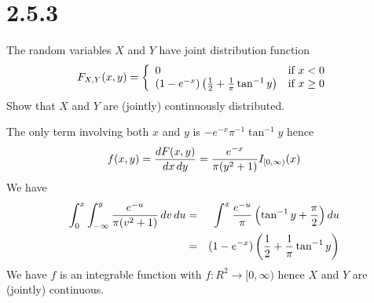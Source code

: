 \section*{2.5.3}
The random variables $X$ and $Y$ have joint distribution function
\begin{displaymath}
F_{X,Y}(x,y)=\left\{
\begin{array}{ll}
0 & \hbox{if $x<0$} \\
(1-e^{-x})\left({1\over2}+{1\over\pi}\tan^{-1}y\right)
&\hbox{if $x\ge0$}
\end{array}
\right.
\end{displaymath}
Show that $X$ and $Y$ are (jointly) continuously distributed.

\bigskip
\noindent
The only term involving both $x$ and $y$ is
$-e^{-x}\pi^{-1}\tan^{-1}y$ hence
$$f(x,y)={dF(x,y)\over dx\,dy}={e^{-x}\over\pi(y^2+1)}
I_{[0,\infty)}(x)$$
We have
\begin{eqnarray*}
\int_0^x\int_{-\infty}^y{e^{-u}\over\pi(v^2+1)}\,dv\,du
&=&\int^x{e^{-u}\over\pi}\left(\tan^{-1}y+{\pi\over2}\right)du\\
&=&(1-e^{-x})\left({1\over2}+{1\over\pi}\tan^{-1}y\right)
\end{eqnarray*}
We have $f$ is an integrable function with $f:R^2\to[0,\infty)$
hence $X$ and $Y$ are (jointly) continuous.
